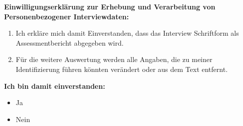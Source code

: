 \documentclass{article}
\begin{document}
\vspace{1cm}

\textbf{Einwilligungserklärung zur Erhebung und Verarbeitung von Personenbezogener Interviewdaten:}

\begin{enumerate}
\item Ich erkläre mich damit Einverstanden, dass das Interview Schriftform als Assessmentbericht abgegeben wird.   
\item Für die weitere Auswertung werden alle Angaben, die zu meiner Identifizierung führen könnten verändert oder aus dem Text entfernt.
\end{enumerate}

\textbf{Ich bin damit einverstanden:}

\begin{itemize}[label={\Square}] 
\item Ja
\item Nein
\end{itemize} 
\bigskip
\end{document}
